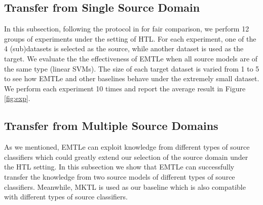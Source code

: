 \subsection{Transfer from Single Source Domain}
In this subsection, following the protocol in \cite{jie2011multiclass,tommasi2014learning} for fair comparison, we perform 12 groups of experiments under the setting of HTL. 
For each experiment, one of the 4 (sub)datasets is selected as the source, while another dataset is used as the target. We evaluate the the effectiveness of EMTLe when all source models are of the same type (linear SVMs).
The size of each target dataset is varied from 1 to 5 to see how EMTLe and other baselines behave under the extremely small dataset.
We perform each experiment 10 times and report the average result in Figure \ref{fig:exp}. 


\subsection{Transfer from Multiple Source Domains}
As we mentioned, EMTLe can exploit knowledge from different types of source classifiers which could greatly extend our selection of the source domain under the HTL setting. In this subsection we show that EMTLe can successfully transfer the knowledge from two source models of different types of source classifiers. Meanwhile, MKTL is used as our baseline which is also compatible with different types of source classifiers. 


